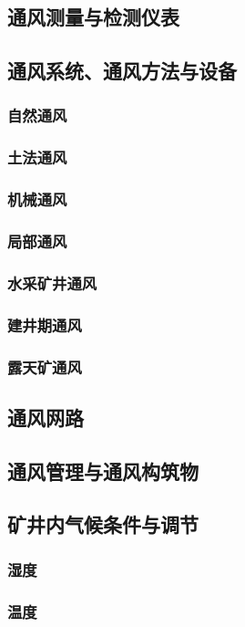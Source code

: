 \documentclass[UTF8]{../../ApplicationUniverse}
\begin{document}
    \subsection{通风测量与检测仪表}
    \subsection{通风系统、通风方法与设备}
        \subsubsection{自然通风}
        \subsubsection{土法通风}
        \subsubsection{机械通风}
        \subsubsection{局部通风}
        \subsubsection{水采矿井通风}
        \subsubsection{建井期通风}
        \subsubsection{露天矿通风}
    \subsection{通风网路}
    \subsection{通风管理与通风构筑物}
    \subsection{矿井内气候条件与调节}
        \subsubsection{湿度}
        \subsubsection{温度}
\end{document}
